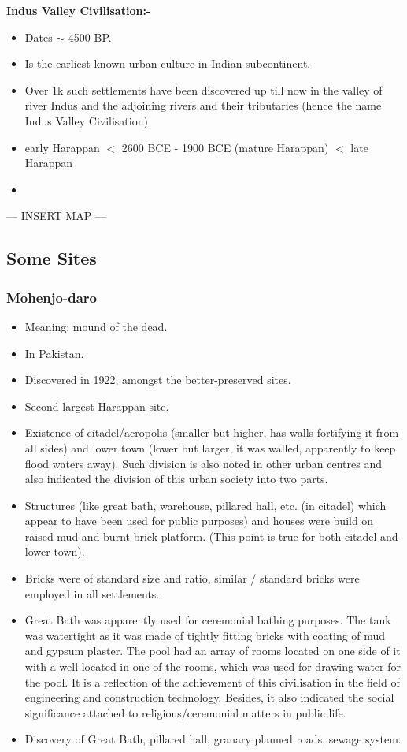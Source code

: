 \documentclass[8pt, a4paper, oneside, twocolumn]{extarticle}
\begin{document}
\textbf{Indus Valley Civilisation:-}
\begin{itemize}
  \item Dates $\sim$ 4500 BP.
  \item Is the earliest known urban culture in Indian subcontinent.
  \item Over 1k such settlements have been discovered up till now in the valley of river Indus and the adjoining rivers and their tributaries (hence the name Indus Valley Civilisation)
  \item early Harappan $<$ 2600 BCE - 1900 BCE (mature Harappan) $<$ late Harappan
  \item 
\end{itemize}

--- INSERT MAP ---
\subsection{Some Sites}
\subsubsection{Mohenjo-daro}
\begin{itemize}
  \item Meaning; mound of the dead.
  \item In Pakistan.
  \item Discovered in 1922, amongst the better-preserved sites.
  \item Second largest Harappan site.
  \item Existence of citadel/acropolis (smaller but higher, has walls fortifying it from all sides) and lower town (lower but larger, it was walled, apparently to keep flood waters away). Such division is also noted in other urban centres and also indicated the division of this urban society into two parts.
  \item Structures (like great bath, warehouse, pillared hall, etc. (in citadel) which appear to have been used for public purposes) and houses were build on raised mud and burnt brick platform. (This point is true for both citadel and lower town).
  \item Bricks were of standard size and ratio, similar / standard bricks were employed in all settlements.
  \item Great Bath was apparently used for ceremonial bathing purposes. The tank was watertight as it was made of tightly fitting bricks with coating of mud and gypsum plaster. The pool had an array of rooms located on one side of it with a well located in one  of the rooms, which was used for drawing water for the pool. It is a reflection of the achievement of this civilisation in the field of engineering and construction technology. Besides, it also indicated the social significance attached to religious/ceremonial matters in public life. 
  \item Discovery of Great Bath, pillared hall, granary planned roads, sewage system.
\end{itemize}
\end{document}
